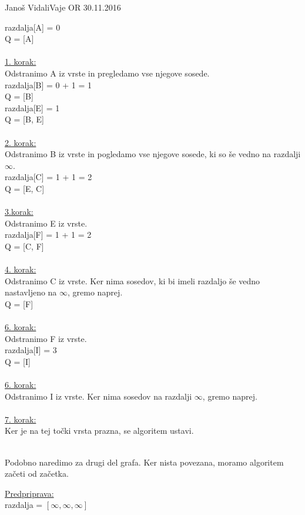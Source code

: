 \begin{naloga}{Janoš Vidali}{Vaje OR 30.11.2016}
\begin{odgovor}
razdalja[A] = 0\\
Q = [A]\\
\\
\underline{1. korak:}\\
Odstranimo A iz vrste in pregledamo vse njegove sosede.\\
razdalja[B] = 0 + 1 = 1\\
Q = [B]\\
razdalja[E] = 1\\
Q = [B, E]\\
\\
\underline{2. korak:}\\
Odstranimo B iz vrste in pogledamo vse njegove sosede, ki so še vedno na razdalji $\infty$.\\
razdalja[C] = 1 + 1 = 2\\
Q = [E, C]\\
\\
\underline{3.korak:}\\
Odstranimo E iz vrste.\\
razdalja[F] = 1 + 1 = 2\\
Q = [C, F]\\
\\
\underline{4. korak:}\\
Odstranimo C iz vrste. Ker nima sosedov, ki bi imeli razdaljo še vedno nastavljeno na $\infty$, gremo naprej.\\
Q = [F]\\
\\
\underline{6. korak:}\\
Odstranimo F iz vrste.\\
razdalja[I] = 3\\
Q = [I]\\
\\
\underline{6. korak:}\\
Odstranimo I iz vrste. Ker nima sosedov na razdalji $\infty$, gremo naprej.\\
\\
\underline{7. korak:}\\
Ker je na tej točki vrsta prazna, se algoritem ustavi.\\
\\
\begin{flushleft}
Podobno naredimo za drugi del grafa. Ker nista povezana, moramo algoritem začeti od začetka. 
\end{flushleft}
\underline{Predpriprava:}\\
razdalja = $[\infty, \infty, \infty]$\\

\end{odgovor}
\end{naloga}
